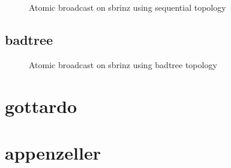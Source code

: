 \begin{figure}[h!]
\begin{tikzpicture}[transform shape,scale=.25]

\end{tikzpicture}

\caption{Atomic broadcast on sbrinz using sequential topology}
\label{fig:ab_sbrinz_sequential}
\end{figure}
\clearpage\subsection{badtree}

\begin{figure}[h!]
\begin{tikzpicture}[transform shape,scale=.25]

\end{tikzpicture}

\caption{Atomic broadcast on sbrinz using badtree topology}
\label{fig:ab_sbrinz_badtree}
\end{figure}
\clearpage\newpage\clearpage\section{gottardo}

\newpage\clearpage\section{appenzeller}

